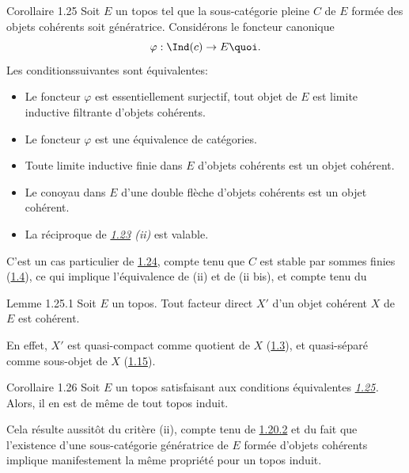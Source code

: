 \begin{enonce*}{Corollaire 1.25}
Soit $E$ un topos tel que la sous-catégorie pleine $C$ de $E$ formée
des objets cohérents soit génératrice. Considérons le foncteur
canonique
$$
\varphi : \Ind(c) \to E{\quoi}.
$$
Les conditions\pageoriginale suivantes sont équivalentes:
\begin{itemize}
\item[(i)] Le foncteur $\varphi$ est essentiellement surjectif, \ie tout
  objet de $E$ est limite inductive filtrante d'objets cohérents.

\item[(i bis)] Le foncteur $\varphi$ est une équivalence de catégories.

\item[(ii)] Toute limite inductive finie dans $E$ d'objets cohérents est
  un objet cohérent.

\item[(ii bis)] Le conoyau dans $E$ d'une double flèche d'objets
  cohérents est un objet cohérent.

\item[(iii)] La réciproque de \emph{\hyperref[VI.thm1.23]{1.23} (ii)} est valable.
\end{itemize}
\end{enonce*}

C'est un cas particulier de \hyperref[VI.cor1.24]{1.24}, compte tenu que $C$ est stable par
sommes finies (\hyperref[VI.cor1.4]{1.4}), ce qui implique l'équivalence de (ii) et de (ii
bis), et compte tenu du

\begin{enonce*}{Lemme 1.25.1}
Soit $E$ un topos. Tout facteur direct $X'$ d'un objet cohérent $X$ de
$E$ est cohérent.
\end{enonce*}

En effet, $X'$ est quasi-compact comme quotient de $X$ (\hyperref[VI.prop1.3]{1.3}), et
quasi-séparé comme sous-objet de $X$ (\hyperref[VI.cor1.15]{1.15}).

\begin{enonce*}{Corollaire 1.26}
Soit $E$ un topos satisfaisant aux conditions équivalentes
\emph{\hyperref[VI.cor1.25]{1.25}.} Alors, il en est de même de tout topos induit.
\end{enonce*}

Cela résulte aussitôt du critère (ii), compte tenu de \hyperref[VI.subsubsec1.20.2]{1.20.2} et du
fait que l'existence d'une sous-catégorie génératrice de $E$ formée
d'objets cohérents implique manifestement la même propriété pour un
topos induit.

